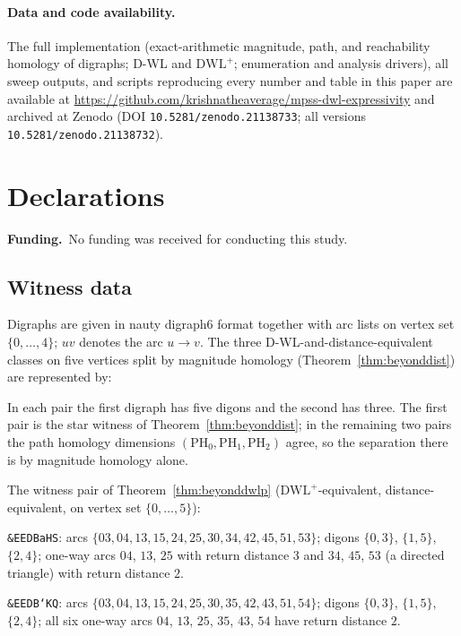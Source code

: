 \documentclass[pdflatex,sn-mathphys,Numbered]{sn-jnl}
\theoremstyle{thmstyleone}
\theoremstyle{thmstyletwo}
\newcommand{\PH}{\mathrm{PH}}
\newcommand{\dwlp}{\mathrm{DWL}^{+}}
\begin{document}
\paragraph{Data and code availability.}
The full implementation (exact-arithmetic magnitude, path, and
reachability homology of digraphs; D-WL and $\dwlp$; enumeration and
analysis drivers), all sweep outputs, and scripts reproducing every
number and table in this paper are available at
\url{https://github.com/krishnatheaverage/mpss-dwl-expressivity} and
archived at Zenodo (DOI \texttt{10.5281/zenodo.21138733}; all versions
\texttt{10.5281/zenodo.21138732}).

\section*{Declarations}

\noindent\textbf{Funding.}\ No funding was received for conducting this
study.

\begin{appendices}

\section{Witness data}\label{app:witnesses}

Digraphs are given in nauty digraph6 format together with arc lists on
vertex set $\{0, \dots, 4\}$; $uv$ denotes the arc $u \to v$. The three
D-WL-and-distance-equivalent classes on five vertices split by magnitude
homology (Theorem~\ref{thm:beyonddist}) are represented by:

\beyonddistpairs

\medskip
In each pair the first digraph has five digons and the second has three.
The first pair is the star witness of Theorem~\ref{thm:beyonddist}; in
the remaining two pairs the path homology dimensions $(\PH_0, \PH_1,
\PH_2)$ agree, so the separation there is by magnitude homology alone.

\medskip
The witness pair of Theorem~\ref{thm:beyonddwlp}
($\dwlp$-equivalent, distance-equivalent, on vertex set
$\{0, \dots, 5\}$):

\medskip
\texttt{\&EEDBaHS}: arcs $\{03, 04, 13, 15, 24, 25, 30, 34, 42, 45,
51, 53\}$; digons $\{0,3\}$, $\{1,5\}$, $\{2,4\}$; one-way arcs $04$,
$13$, $25$ with return distance $3$ and $34$, $45$, $53$ (a directed
triangle) with return distance $2$.

\texttt{\&EEDB`KQ}: arcs $\{03, 04, 13, 15, 24, 25, 30, 35, 42, 43,
51, 54\}$; digons $\{0,3\}$, $\{1,5\}$, $\{2,4\}$; all six one-way
arcs $04$, $13$, $25$, $35$, $43$, $54$ have return distance $2$.

\end{appendices}


\end{document}
